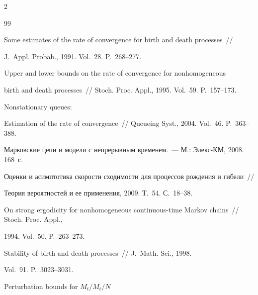 \begin{multicols}{2}
{{\begin{thebibliography}{99}

 Some estimates of the rate of convergence for birth and death processes~//

J.~Appl. Probab., 1991. Vol.~28. P.~268--277.





Upper and lower bounds on the rate of convergence for nonhomogeneous

birth and death processes~// Stoch. Proc. Appl., 1995. Vol.~59. P.~157--173.




 Nonstationary queues:

Estimation of the rate of convergence~// Queueing Syst., 2004. Vol.~46. P.~363--388.





Марковские цепи и модели с непрерывным временем.~--- М.: Элекс-КМ, 2008. 168~с.





Оценки и асимптотика скорости сходимости для процессов рождения и гибели~//

Теория вероятностей и ее применения, 2009. Т.~54. С.~18--38.





On strong ergodicity for nonhomogeneous continuous-time Markov chains~// Stoch. Proc. Appl.,

1994. Vol.~50. P.~263--273.




  Stability of birth and death processes~//  J.~Math. Sci., 1998.

Vol.~91. P.~3023--3031.




  Perturbation bounds for $M_t/M_t/N$


\end{thebibliography}}}
\end{multicols}
